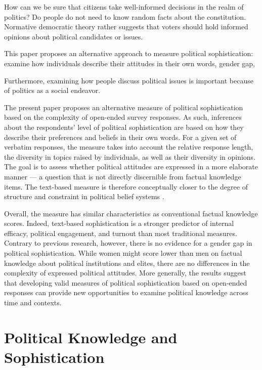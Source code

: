 \documentclass[12pt]{article}
\begin{document}
How can we be sure that citizens take well-informed decisions in the realm of politics? Do people do not need to know random facts about the constitution. Normative democratic theory rather suggests that voters should hold informed opinions about political candidates or issues.

This paper proposes an alternative approach to measure political sophistication: examine how individuals describe their attitudes in their own words, gender gap, 

Furthermore, examining how people discuss political issues is important because of politics as a social endeavor.


The present paper proposes an alternative measure of political sophistication based on the complexity of open-ended survey responses. As such, inferences about the respondents' level of political sophistication are based on how they describe their preferences and beliefs in their own words. For a given set of verbatim responses, the measure takes into account the relative response length, the diversity in topics raised by individuals, as well as their diversity in opinions. The goal is to assess whether political attitudes are expressed in a more elaborate manner --- a question that is not directly discernible from factual knowledge items. The text-based measure is therefore conceptually closer to the degree of structure and constraint in political belief systems
\citep[see for example][]{tetlock1983cognitive,luskin1987measuring}. 

Overall, the measure has similar characteristics as conventional factual knowledge scores. Indeed, text-based sophistication is a stronger predictor of internal efficacy, political engagement, and turnout than most traditional measures. Contrary to previous research, however, there is no evidence for a gender gap in political sophistication. While women might score lower than men on factual knowledge about political institutions and elites, there are no differences in the complexity of expressed political attitudes. More generally, the results suggest that developing valid measures of political sophistication based on open-ended responses can provide new opportunities to examine political knowledge across time and contexts. 


\section*{Political Knowledge and Sophistication}
\end{document}
